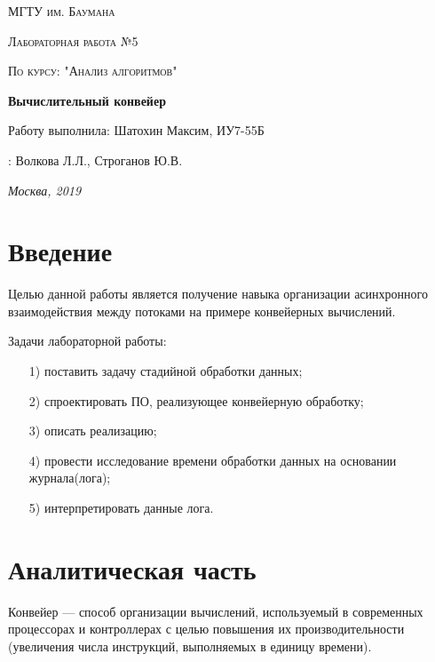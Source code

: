 \documentclass[a4paper,14pt]{report}
\begin{document}
\begin{titlepage}
	\centering
	{\scshape\LARGE МГТУ им. Баумана \par}
	\vspace{3cm}
	{\scshape\Large Лабораторная работа №5\par}
	\vspace{0.5cm}
	{\scshape\Large По курсу: "Анализ алгоритмов"\par}
	\vspace{1.5cm}
	{\huge\bfseries Вычислительный конвейер\par}
	\vspace{2cm}
	\Large Работу выполнила: Шатохин Максим, ИУ7-55Б\par
	\vspace{0.5cm}
	:  Волкова Л.Л., Строганов Ю.В.\par

	\vfill
	\large \textit {Москва, 2019} \par
\end{titlepage}

\tableofcontents

\newpage
\chapter*{Введение}

Целью данной работы является получение навыка организации асинхронного взаимодействия между потоками на примере конвейерных вычислений.

Задачи лабораторной работы:
\begin{enumerate}
	\item[1)] поставить задачу стадийной обработки данных;
	\item[2)] спроектировать ПО, реализующее конвейерную обработку;
	\item[3)] описать реализацию;
  	\item[4)] провести исследование времени обработки данных на основании журнала(лога);
	\item[5)] интерпретировать данные лога.
\end{enumerate}


\chapter*{Аналитическая часть}
Конвейер — способ организации вычислений, используемый в современных процессорах и контроллерах с целью повышения их производительности (увеличения числа инструкций, выполняемых в единицу времени).
\end{document}
